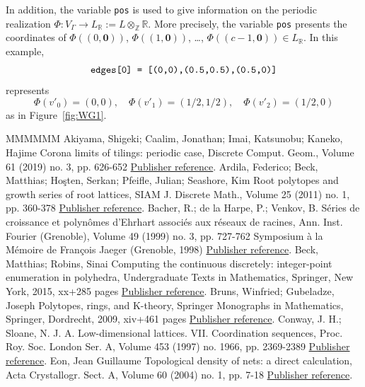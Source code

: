 \documentclass[11pt]{article}
\theoremstyle{definition}
\numberwithin{equation}{section}
\begin{document}
In addition, the variable \verb~pos~ is used to give information on the periodic realization $\Phi: V_{\Gamma} \to L_{\mathbb{R}} := L \otimes _{\mathbb{Z}} \mathbb{R}$. 
More precisely, the variable \verb~pos~ presents the coordinates of $\Phi\left((0,\mathbf{0})\right)$, $\Phi\left((1,\mathbf{0})\right)$, \dots, $\Phi\left((c-1,\mathbf{0})\right) \in L_{\mathbb{R}}$. 
In this example, 
\[
\text{\verb~edges[0] = [(0,0),(0.5,0.5),(0.5,0)]~}
\]
represents
\[
\Phi(v'_0) = (0,0), \quad 
\Phi(v'_1) = (1/2,1/2), \quad
\Phi(v'_2) = (1/2,0)
\]
as in Figure~\ref{fig:WG1}. 
\begin{thebibliography}{MMMMMM}
 Akiyama, Shigeki; Caalim, Jonathan; Imai, Katsunobu; Kaneko, Hajime Corona limits of tilings: periodic case, Discrete Comput. Geom., Volume 61 (2019) no. 3, pp. 626-652 \href{https://alco.centre-mersenne.org/articles/10.5802/alco.445/#ACIK}{Publisher reference}.
 Ardila, Federico; Beck, Matthias; Hoşten, Serkan; Pfeifle, Julian; Seashore, Kim Root polytopes and growth series of root lattices, SIAM J. Discrete Math., Volume 25 (2011) no. 1, pp. 360-378 \href{https://alco.centre-mersenne.org/articles/10.5802/alco.445/#ABHPS}{Publisher reference}.
 Bacher, R.; de la Harpe, P.; Venkov, B. Séries de croissance et polynômes d’Ehrhart associés aux réseaux de racines, Ann. Inst. Fourier (Grenoble), Volume 49 (1999) no. 3, pp. 727-762 Symposium à la Mémoire de François Jaeger (Grenoble, 1998) \href{https://alco.centre-mersenne.org/articles/10.5802/alco.445/#BHV99}{Publisher reference}.
 Beck, Matthias; Robins, Sinai Computing the continuous discretely: integer-point enumeration in polyhedra, Undergraduate Texts in Mathematics, Springer, New York, 2015, xx+285 pages \href{https://alco.centre-mersenne.org/articles/10.5802/alco.445/#BR}{Publisher reference}.
 Bruns, Winfried; Gubeladze, Joseph Polytopes, rings, and K-theory, Springer Monographs in Mathematics, Springer, Dordrecht, 2009, xiv+461 pages \href{https://alco.centre-mersenne.org/articles/10.5802/alco.445/#BG2009}{Publisher reference}.
 Conway, J. H.; Sloane, N. J. A. Low-dimensional lattices. VII. Coordination sequences, Proc. Roy. Soc. London Ser. A, Volume 453 (1997) no. 1966, pp. 2369-2389 \href{https://alco.centre-mersenne.org/articles/10.5802/alco.445/#CS97}{Publisher reference}.
 Eon, Jean Guillaume Topological density of nets: a direct calculation, Acta Crystallogr. Sect. A, Volume 60 (2004) no. 1, pp. 7-18 \href{https://alco.centre-mersenne.org/articles/10.5802/alco.445/#Eon04}{Publisher reference}.

\end{thebibliography}
\end{document}
